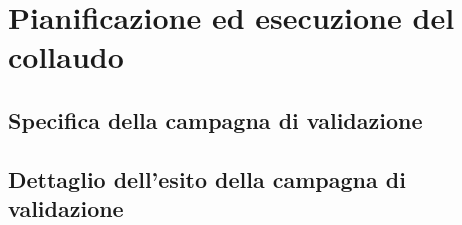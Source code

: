 \section{Pianificazione ed esecuzione del collaudo}
	\subsection{Specifica della campagna di validazione}
	\subsection{Dettaglio dell'esito della campagna di validazione}